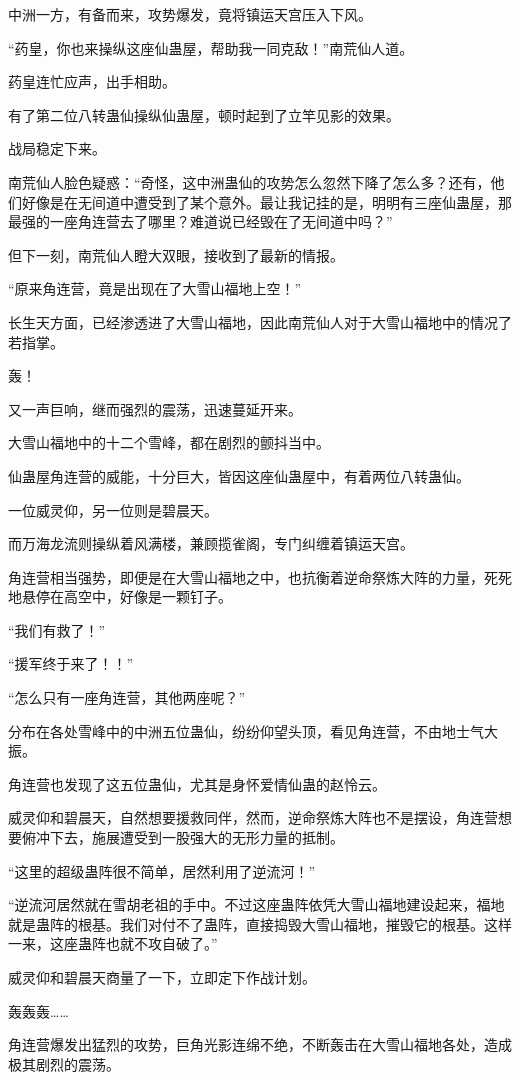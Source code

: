 \begin{this_body}
中洲一方，有备而来，攻势爆发，竟将镇运天宫压入下风。

“药皇，你也来操纵这座仙蛊屋，帮助我一同克敌！”南荒仙人道。

药皇连忙应声，出手相助。

有了第二位八转蛊仙操纵仙蛊屋，顿时起到了立竿见影的效果。

战局稳定下来。

南荒仙人脸色疑惑：“奇怪，这中洲蛊仙的攻势怎么忽然下降了怎么多？还有，他们好像是在无间道中遭受到了某个意外。最让我记挂的是，明明有三座仙蛊屋，那最强的一座角连营去了哪里？难道说已经毁在了无间道中吗？”

但下一刻，南荒仙人瞪大双眼，接收到了最新的情报。

“原来角连营，竟是出现在了大雪山福地上空！”

长生天方面，已经渗透进了大雪山福地，因此南荒仙人对于大雪山福地中的情况了若指掌。

轰！

又一声巨响，继而强烈的震荡，迅速蔓延开来。

大雪山福地中的十二个雪峰，都在剧烈的颤抖当中。

仙蛊屋角连营的威能，十分巨大，皆因这座仙蛊屋中，有着两位八转蛊仙。

一位威灵仰，另一位则是碧晨天。

而万海龙流则操纵着风满楼，兼顾揽雀阁，专门纠缠着镇运天宫。

角连营相当强势，即便是在大雪山福地之中，也抗衡着逆命祭炼大阵的力量，死死地悬停在高空中，好像是一颗钉子。

“我们有救了！”

“援军终于来了！！”

“怎么只有一座角连营，其他两座呢？”

分布在各处雪峰中的中洲五位蛊仙，纷纷仰望头顶，看见角连营，不由地士气大振。

角连营也发现了这五位蛊仙，尤其是身怀爱情仙蛊的赵怜云。

威灵仰和碧晨天，自然想要援救同伴，然而，逆命祭炼大阵也不是摆设，角连营想要俯冲下去，施展遭受到一股强大的无形力量的抵制。

“这里的超级蛊阵很不简单，居然利用了逆流河！”

“逆流河居然就在雪胡老祖的手中。不过这座蛊阵依凭大雪山福地建设起来，福地就是蛊阵的根基。我们对付不了蛊阵，直接捣毁大雪山福地，摧毁它的根基。这样一来，这座蛊阵也就不攻自破了。”

威灵仰和碧晨天商量了一下，立即定下作战计划。

轰轰轰……

角连营爆发出猛烈的攻势，巨角光影连绵不绝，不断轰击在大雪山福地各处，造成极其剧烈的震荡。


\end{this_body}
